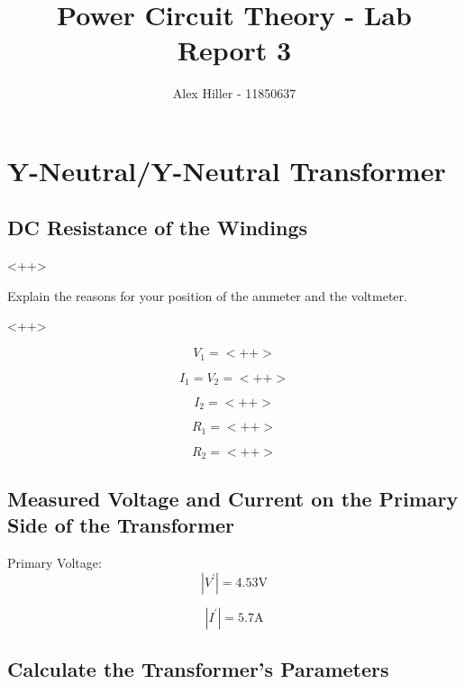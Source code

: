 \documentclass{article}
\author{Alex Hiller - 11850637}
\title{Power Circuit Theory - Lab Report 3}
\begin{document}
\maketitle


\clearpage

\section{Y-Neutral/Y-Neutral Transformer}

\subsection{DC Resistance of the Windings}
<++>

Explain the reasons for your position of the ammeter and the voltmeter.

<++>

\begin{equation}
  V_1 = <++>
\end{equation}

\begin{equation}
  I_1 = V_2 = <++>
\end{equation}

\begin{equation}
  I_2 = <++>
\end{equation}

\begin{equation}
  R_1 = <++>
\end{equation}

\begin{equation}
  R_2 = <++>
\end{equation}

\subsection{Measured Voltage and Current on the Primary Side of the Transformer}

Primary Voltage:
\begin{equation}
  | V^{'} | = 4.53 \text{V}
\end{equation} 

\begin{equation}
  | I^{'} | = 5.7 \text{A}
\end{equation} 

\subsection{Calculate the Transformer's Parameters} 
\end{document}
